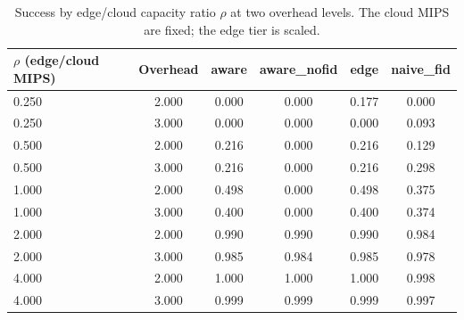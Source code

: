 \begin{table}
\centering
\footnotesize
\caption{Success by edge/cloud capacity ratio $\rho$ at two overhead levels. The cloud MIPS are fixed; the edge tier is scaled.}
\label{tab:p2-capacity}
\begin{tabular}{lccccc}
\toprule
$\rho$ (edge/cloud MIPS) & Overhead & aware & aware\_nofid & edge & naive\_fid \\
\midrule
0.250 & 2.000 & 0.000 & 0.000 & 0.177 & 0.000 \\
0.250 & 3.000 & 0.000 & 0.000 & 0.000 & 0.093 \\
0.500 & 2.000 & 0.216 & 0.000 & 0.216 & 0.129 \\
0.500 & 3.000 & 0.216 & 0.000 & 0.216 & 0.298 \\
1.000 & 2.000 & 0.498 & 0.000 & 0.498 & 0.375 \\
1.000 & 3.000 & 0.400 & 0.000 & 0.400 & 0.374 \\
2.000 & 2.000 & 0.990 & 0.990 & 0.990 & 0.984 \\
2.000 & 3.000 & 0.985 & 0.984 & 0.985 & 0.978 \\
4.000 & 2.000 & 1.000 & 1.000 & 1.000 & 0.998 \\
4.000 & 3.000 & 0.999 & 0.999 & 0.999 & 0.997 \\
\bottomrule
\end{tabular}
\par\vspace{2pt}{\footnotesize\raggedright A small $\rho$ is a weak edge; a large $\rho$ is a strong edge. The comparison uses identical arrivals and workload.\par}
\end{table}
